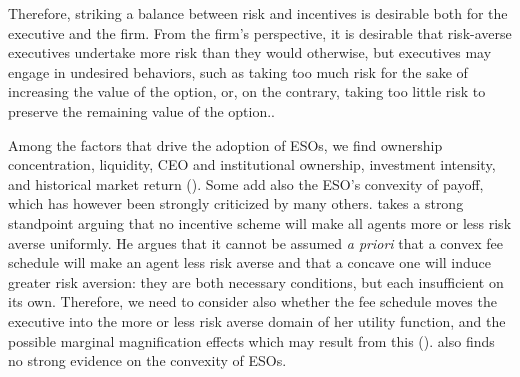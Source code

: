     Therefore, striking a balance between risk and incentives is desirable both for the executive and the firm. From the firm’s perspective, it is desirable that risk-averse executives undertake more risk than they would otherwise, but executives may engage in undesired behaviors, such as taking too much risk for the sake of increasing the value of the option, or, on the contrary, taking too little risk to preserve the remaining value of the option.\cite{grinblatt1989adverse}.

    Among the factors that drive the adoption of ESOs, we find ownership concentration, liquidity, CEO and institutional ownership, investment intensity, and historical market return (\cite{pasternack2002factors}). Some add also the ESO's convexity of payoff, which has however been strongly criticized by many others. \cite{ross2004compensation} takes a strong standpoint arguing that no incentive scheme will make all agents more or less risk averse uniformly. He argues that it cannot be assumed \textit{a priori} that a convex fee schedule will make an agent less risk averse and that a concave one will induce greater risk aversion: they are both necessary conditions, but each insufficient on its own. Therefore, we need to consider also whether the fee schedule moves the executive into the more or less risk averse domain of her utility function, and the possible marginal magnification effects which may result from this (\cite{ross2004compensation}). \cite{hayes2012stock} also finds no strong evidence on the convexity of ESOs. 
